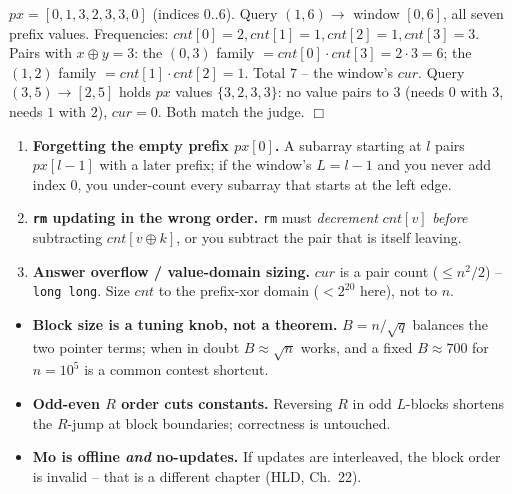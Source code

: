 \begin{tracebox}
\(px=[0,1,3,2,3,3,0]\) (indices \(0..6\)).  Query \((1,6)\to\) window \([0,6]\), all
seven prefix values.  Frequencies: \(\mathit{cnt}[0]{=}2,\mathit{cnt}[1]{=}1,
\mathit{cnt}[2]{=}1,\mathit{cnt}[3]{=}3\).  Pairs with \(x\oplus y=3\): the
\((0,3)\) family \(=\mathit{cnt}[0]\!\cdot\!\mathit{cnt}[3]=2\!\cdot\!3=6\); the
\((1,2)\) family \(=\mathit{cnt}[1]\!\cdot\!\mathit{cnt}[2]=1\).  Total
\(\boxed{7}\) -- the window's \(cur\).  Query \((3,5)\to[2,5]\) holds \(px\) values
\(\{3,2,3,3\}\): no value pairs to \(3\) (needs \(0\) with \(3\), needs \(1\) with
\(2\)), \(cur=\boxed{0}\).  Both match the judge. \(\Box\)
\end{tracebox}

\begin{warningbox}
\begin{enumerate}[nosep,leftmargin=1.6em]
  \item \textbf{Forgetting the empty prefix \(px[0]\).} A subarray starting at \(l\)
        pairs \(px[l{-}1]\) with a later prefix; if the window's \(L=l-1\) and you never
        add index \(0\), you under-count every subarray that starts at the left edge.
  \item \textbf{\texttt{rm} updating in the wrong order.} \texttt{rm} must
        \emph{decrement} \(\mathit{cnt}[v]\) \emph{before} subtracting
        \(\mathit{cnt}[v\oplus k]\), or you subtract the pair that is itself leaving.
  \item \textbf{Answer overflow / value-domain sizing.} \(cur\) is a pair count
        (\(\le n^2/2\)) -- \texttt{long long}.  Size \(\mathit{cnt}\) to the prefix-xor
        domain (\(<2^{20}\) here), not to \(n\).
\end{enumerate}
\end{warningbox}

\begin{hardeningbox}
\begin{itemize}[nosep,leftmargin=1.4em]
  \item \textbf{Block size is a tuning knob, not a theorem.} \(B=n/\sqrt q\) balances
        the two pointer terms; when in doubt \(B\approx\sqrt n\) works, and a fixed
        \(B\approx 700\) for \(n=10^5\) is a common contest shortcut.
  \item \textbf{Odd-even \(R\) order cuts constants.} Reversing \(R\) in odd \(L\)-blocks
        shortens the \(R\)-jump at block boundaries; correctness is untouched.
  \item \textbf{Mo is offline \emph{and} no-updates.} If updates are interleaved, the
        block order is invalid -- that is a different chapter (HLD, Ch.~22).
\end{itemize}
\end{hardeningbox}

